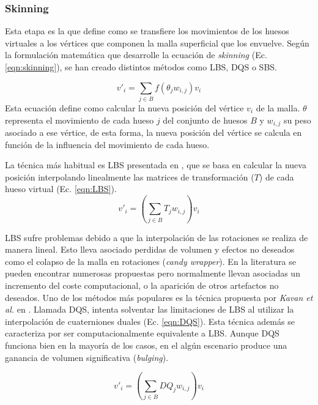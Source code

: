 \subsubsection{Skinning}
\label{art:skinning}

Esta etapa es la que define como se transfiere los movimientos de los huesos virtuales a los vértices que componen la malla superficial que los envuelve. Según la formulación matemática que desarrolle la ecuación de \emph{skinning} (Ec. \ref{eqn:skinning}), se han creado distintos métodos como \ac{LBS}, \ac{DQS} o \ac{SBS}.

\begin{equation}
\label{eqn:skinning}
v'_{i} = \sum_{j \in B} f(\theta_{j}w_{i,j}) v_{i}
\end{equation}
Esta ecuación define como calcular la nueva posición del vértice $v_{i}$ de la malla. $\theta$ representa el movimiento de cada hueso $j$ del conjunto de huesos $B$ y $w_{i,j}$ su peso asociado a ese vértice, de esta forma, la nueva posición del vértice se calcula en función de la influencia del movimiento de cada hueso.

La técnica más habitual es \ac{LBS} presentada en \cite{thalmann88}, que se basa en calcular la nueva posición interpolando linealmente las matrices de transformación ($T$) de cada hueso virtual (Ec. \ref{eqn:LBS}).
\begin{equation}
\label{eqn:LBS}
v'_{i} = (\sum_{j \in B} T_{j}w_{i,j}) v_{i}
\end{equation}

\ac{LBS} sufre problemas debido a que la interpolación de las rotaciones se realiza de manera lineal. Esto lleva asociado perdidas de volumen y efectos no deseados como el colapso de la malla en rotaciones (\emph{candy wrapper}). En la literatura se pueden encontrar numerosas propuestas \cite{rumman2016state} pero normalmente llevan asociadas un incremento del coste computacional, o la aparición de otros artefactos no deseados. Uno de los métodos más populares es la técnica propuesta por \emph{Kavan et al.} en \cite{Kavan2008}. Llamada \ac{DQS}, intenta solventar las limitaciones de \ac{LBS} al utilizar la interpolación de cuaterniones duales (Ec. \ref{eqn:DQS}). Esta técnica además se caracteriza por ser computacionalmente equivalente a \ac{LBS}. Aunque \ac{DQS} funciona bien en la mayoría de los casos, en el algún escenario produce una ganancia de volumen significativa (\emph{bulging}). 

\begin{equation}
\label{eqn:DQS}
v'_{i} = (\sum_{j \in B} DQ_{j}w_{i,j}) v_{i}
\end{equation}


